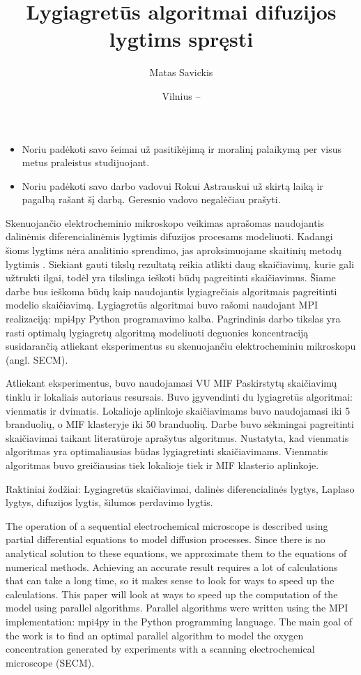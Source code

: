 \documentclass{VUMIFPSkursinis}
\title{Lygiagretūs algoritmai difuzijos lygtims spręsti}
\author{Matas Savickis}
\date{Vilnius – \the\year}
\begin{document}
\maketitle

\begin{itemize}
\item{Noriu padėkoti savo šeimai už pasitikėjimą ir moralinį palaikymą per visus metus praleistus studijuojant.}
\item{Noriu padėkoti savo darbo vadovui Rokui Astrauskui už skirtą laiką ir pagalbą rašant šį darbą. Geresnio vadovo negalėčiau prašyti.}
\end{itemize}
\pagebreak

Skenuojančio elektrocheminio mikroskopo veikimas aprašomas naudojantis dalinėmis diferencialinėmis lygtimis difuzijos procesams modeliuoti.
Kadangi šioms lygtims nėra analitinio sprendimo, jas aproksimuojame skaitinių metodų lygtimis \cite{NumAnal}.
Siekiant gauti tikslų rezultatą reikia atlikti daug skaičiavimų, kurie gali užtrukti ilgai, todėl yra tikslinga ieškoti būdų pagreitinti skaičiavimus.
Šiame darbe bus ieškoma būdų kaip naudojantis lygiagrečiais algoritmais pagreitinti modelio skaičiavimą.
Lygiagretūs algoritmai buvo rašomi naudojant MPI realizaciją: mpi4py Python programavimo kalba. 
Pagrindinis darbo tikslas yra rasti optimalų lygiagretų algoritmą modeliuoti deguonies koncentraciją susidarančią atliekant eksperimentus su skenuojančiu elektrocheminiu mikroskopu (angl. SECM).


Atliekant eksperimentus, buvo naudojamasi VU MIF Paskirstytų skaičiavimų tinklu ir lokaliais autoriaus resursais.
Buvo įgyvendinti du lygiagretūs algoritmai: vienmatis ir dvimatis.
Lokalioje aplinkoje skaičiavimams buvo naudojamasi iki 5 branduolių, o MIF klasteryje iki 50 branduolių.
Darbe buvo sėkmingai pagreitinti skaičiavimai taikant literatūroje aprašytus algoritmus\cite{Lygeg}.
Nustatyta, kad vienmatis algoritmas yra optimaliausias būdas lygiagretinti skaičiavimams.
Vienmatis algoritmas buvo greičiausias tiek lokalioje tiek ir MIF klasterio aplinkoje.

Raktiniai žodžiai: Lygiagretūs skaičiavimai, dalinės diferencialinės lygtys, Laplaso lygtys, difuzijos lygtis, šilumos perdavimo lygtis.
\pagebreak

The operation of a sequential electrochemical microscope is described using partial differential equations to model diffusion processes. 
Since there is no analytical solution to these equations, we approximate them to the equations of numerical methods.
Achieving an accurate result requires a lot of calculations that can take a long time, so it makes sense to look for ways to speed up the calculations.
This paper will look at ways to speed up the computation of the model using parallel algorithms.
Parallel algorithms were written using the MPI implementation: mpi4py in the Python programming language.
The main goal of the work is to find an optimal parallel algorithm to model the oxygen concentration generated by experiments with a scanning electrochemical microscope (SECM).
\end{document}
